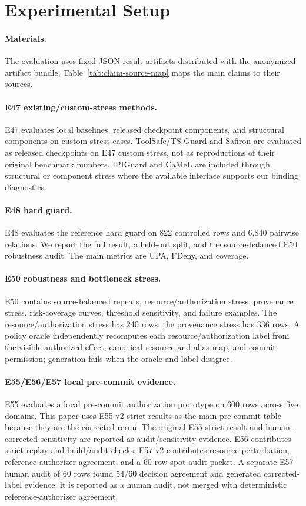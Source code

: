 \section{Experimental Setup}

\paragraph{Materials.}
The evaluation uses fixed JSON result artifacts distributed with the anonymized artifact bundle; Table~\ref{tab:claim-source-map} maps the main claims to their sources.

\paragraph{E47 existing/custom-stress methods.}
E47 evaluates local baselines, released checkpoint components, and structural components on custom stress cases. ToolSafe/TS-Guard and Safiron are evaluated as released checkpoints on E47 custom stress, not as reproductions of their original benchmark numbers. IPIGuard and CaMeL are included through structural or component stress where the available interface supports our binding diagnostics.

\paragraph{E48 hard guard.}
E48 evaluates the reference hard guard on 822 controlled rows and 6,840 pairwise relations. We report the full result, a held-out split, and the source-balanced E50 robustness audit. The main metrics are UPA, FDeny, and coverage.

\paragraph{E50 robustness and bottleneck stress.}
E50 contains source-balanced repeats, resource/authorization stress, provenance stress, risk-coverage curves, threshold sensitivity, and failure examples. The resource/authorization stress has 240 rows; the provenance stress has 336 rows. A policy oracle independently recomputes each resource/authorization label from the visible authorized effect, canonical resource and alias map, and commit permission; generation fails when the oracle and label disagree.

\paragraph{E55/E56/E57 local pre-commit evidence.}
E55 evaluates a local pre-commit authorization prototype on 600 rows across five domains. This paper uses E55-v2 strict results as the main pre-commit table because they are the corrected rerun. The original E55 strict result and human-corrected sensitivity are reported as audit/sensitivity evidence. E56 contributes strict replay and build/audit checks. E57-v2 contributes resource perturbation, reference-authorizer agreement, and a 60-row spot-audit packet. A separate E57 human audit of 60 rows found 54/60 decision agreement and generated corrected-label evidence; it is reported as a human audit, not merged with deterministic reference-authorizer agreement.

